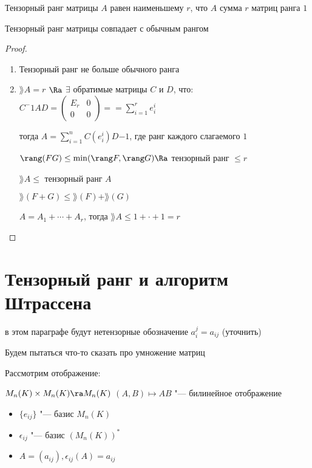 Тензорный ранг матрицы $A$ равен наименьшему $r$, что $A$ сумма $r$ матриц ранга $1$

\begin{theorem}
    Тензорный ранг матрицы совпадает с обычным рангом
\end{theorem}

\begin{proof}
    \begin{enumerate}
        \item Тензорный ранг не больше обычного ранга
        \item $\rang A = r$ $\Ra$ $\exists$ обратимые матрицы $C$ и $D$, что:
            $C^-1AD = 
            \begin{pmatrix}
                 E_r & 0 \\
                 0 & 0 
            \end{pmatrix} == \sum_{i = 1}^r e_i^i$

            тогда $A = \sum_{i=1}^n C(e_i^i)D{-1}$, где ранг каждого слагаемого $1$

            $\rang (F G) \leq \min (\rang F, \rang G) \Ra$ тензорный ранг $\leq r$

            $\rang A \leq $ тензорный ранг $A$

            $\rang(F + G) \leq \rang(F) + \rang(G)$

            $A = A_1 + \cdots + A_r$, тогда $\rang A \leq 1 + \cdot + 1 = r$
    \end{enumerate}
\end{proof}

\section{Тензорный ранг и алгоритм Штрассена}

в этом параграфе будут нетензорные обозначение $a_i^j = a_{ij}$ (уточнить)

Будем пытаться что-то сказать про умножение матриц

Рассмотрим отображение:

$ M_n(K) \times M_n(K) \ra M_n(K)$
$ (A, B) \mapsto AB$ "--- билинейное отображение

\begin{itemize}
    \item $\{e_{ij}\}$ "--- базис $M_n(K)$
    \item $\epsilon_{ij}$ "--- базис $(M_n(K))^*$
    \item $A = (a_{ij}), \epsilon_{ij}(A) = a_{ij}$
\end{itemize}

